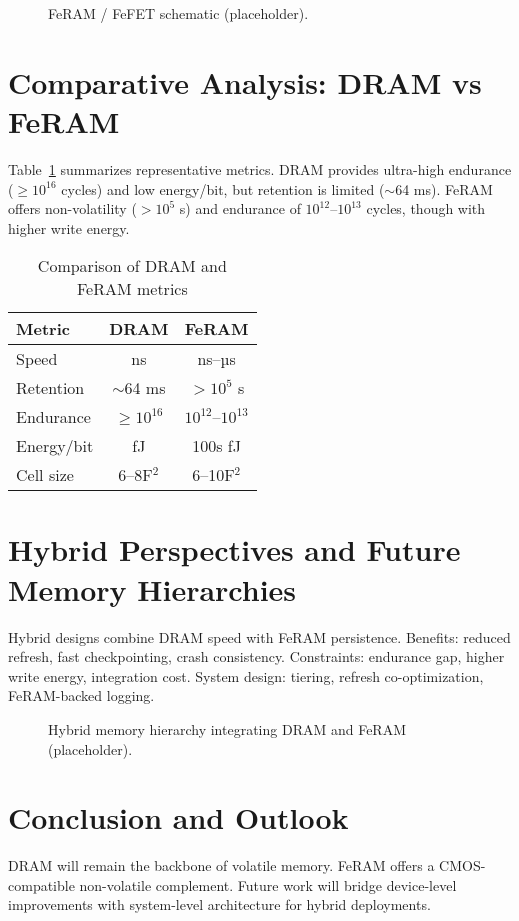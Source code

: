\documentclass[journal]{IEEEtran}
\begin{document}
\begin{figure}[!t]
\centering
{}
\caption{FeRAM / FeFET schematic (placeholder).}
\label{fig:feram}
\end{figure}

\section{Comparative Analysis: DRAM vs FeRAM}
Table~\ref{tab:comparison} summarizes representative metrics. DRAM provides ultra-high endurance ($\geq 10^{16}$ cycles) and low energy/bit, but retention is limited ($\sim$64 ms). FeRAM offers non-volatility ($>10^5$ s) and endurance of $10^{12}$--$10^{13}$ cycles, though with higher write energy.

\begin{table}[!t]
\centering
\caption{Comparison of DRAM and FeRAM metrics}
\label{tab:comparison}
\begin{tabular}{lcc}
\toprule
Metric & DRAM & FeRAM \\
\midrule
Speed & ns & ns--µs \\
Retention & $\sim$64 ms & $>10^5$ s \\
Endurance & $\geq 10^{16}$ & $10^{12}$--$10^{13}$ \\
Energy/bit & fJ & 100s fJ \\
Cell size & 6--8F$^2$ & 6--10F$^2$ \\
\bottomrule
\end{tabular}
\end{table}

\section{Hybrid Perspectives and Future Memory Hierarchies}
Hybrid designs combine DRAM speed with FeRAM persistence. Benefits: reduced refresh, fast checkpointing, crash consistency. Constraints: endurance gap, higher write energy, integration cost. System design: tiering, refresh co-optimization, FeRAM-backed logging.

\begin{figure}[!t]
\centering
{}
\caption{Hybrid memory hierarchy integrating DRAM and FeRAM (placeholder).}
\label{fig:hybrid_hierarchy}
\end{figure}

\section{Conclusion and Outlook}
DRAM will remain the backbone of volatile memory. FeRAM offers a CMOS-compatible non-volatile complement. Future work will bridge device-level improvements with system-level architecture for hybrid deployments.

\nocite{*}


\end{document}
